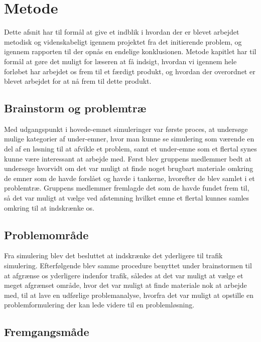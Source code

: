 \chapter{Metode}\label{Metode}

Dette afsnit har til formål at give et indblik i hvordan der er blevet arbejdet metodisk og videnskabeligt igennem projektet fra det initierende problem, og igennem rapporten til der opnås en endelige konklusionen. Metode kapitlet har til formål at gøre det muligt for læseren at få indsigt, hvordan vi igennem hele forløbet har arbejdet os frem til et færdigt produkt, og hvordan der overordnet er blevet arbejdet for at nå frem til dette produkt.

\section{Brainstorm og problemtræ}

Med udgangspunkt i hovede-emnet simuleringer var første proces, at undersøge mulige kategorier af under-emner, hvor man kunne se simulering som værende en del af en løsning til at afvikle et problem, samt et under-emne som et flertal synes kunne være interessant at arbejde med. Først blev gruppens medlemmer bedt at undersøge hvorvidt om det var muligt at finde noget brugbart materiale omkring de emner som de havde forslået og havde i tankerne, hvorefter de blev samlet i et problemtræ. Gruppens medlemmer fremlagde det som de havde fundet frem til, så det var muligt at vælge ved afstemning hvilket emne et flertal kunnes samles omkring til at indskrænke os.

\section{Problemområde}

Fra simulering blev det besluttet at indskrænke det yderligere til trafik simulering. Efterfølgende blev samme procedure benyttet under brainstormen til at afgrænse os yderligere indenfor trafik, således at det var muligt at vælge et meget afgrænset område, hvor det var muligt at finde materiale nok at arbejde med, til at lave en udførlige problemanalyse, hvorfra det var muligt at opstille en problemformulering der kan lede videre til en problemløsning. 

\section{Fremgangsmåde}

